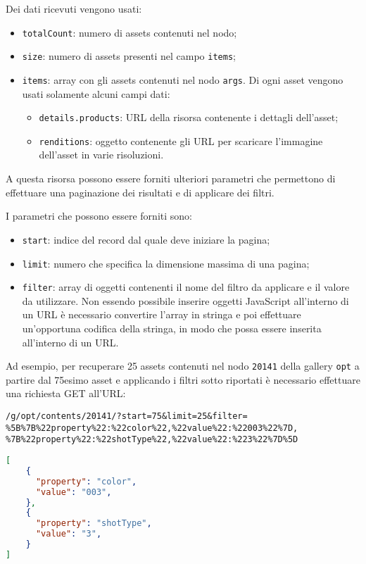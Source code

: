 Dei dati ricevuti vengono usati:
\begin{itemize}
\item \texttt{totalCount}: numero di assets contenuti nel nodo;
\item \texttt{size}: numero di assets presenti nel campo \texttt{items};
\item \texttt{items}: array con gli assets contenuti nel nodo \texttt{args}. Di ogni asset vengono usati solamente alcuni campi dati:
	\begin{itemize}
	\item \texttt{details.products}: URL della risorsa contenente i dettagli dell'asset;
	\item \texttt{renditions}: oggetto contenente gli URL per scaricare l'immagine dell'asset in varie risoluzioni.
	\end{itemize}
\end{itemize}

A questa risorsa possono essere forniti ulteriori parametri che permettono di effettuare una paginazione dei risultati e di applicare dei filtri.

I parametri che possono essere forniti sono:
\begin{itemize}
\item \texttt{start}: indice del record dal quale deve iniziare la pagina;
\item \texttt{limit}: numero che specifica la dimensione massima di una pagina;
\item \texttt{filter}: array di oggetti contenenti il nome del filtro da applicare e il valore da utilizzare. Non essendo possibile inserire oggetti JavaScript all'interno di un URL è necessario convertire l'array in stringa e poi effettuare un'opportuna codifica della stringa, in modo che possa essere inserita all'interno di un URL.
\end{itemize}

Ad esempio, per recuperare 25 assets contenuti nel nodo \texttt{20141} della gallery \texttt{opt} a partire dal 75esimo asset e applicando i filtri sotto riportati è necessario effettuare una richiesta GET all'URL:

\begin{center}
\texttt{/g/opt/contents/20141/?start=75\&limit=25\&filter= \%5B\%7B\%22property\%22:\%22color\%22,\%22value\%22:\%22003\%22\%7D, \%7B\%22property\%22:\%22shotType\%22,\%22value\%22:\%223\%22\%7D\%5D}
\end{center}

\begin{lstlisting}[language=JSON, caption=Esempio dell'array da utilizzare per applicare dei filtri alla risorsa /g/{galleryCode}/contents/{args}, label=lst:filters]
[
	{
	  "property": "color",
	  "value": "003",
	},
	{
	  "property": "shotType",
	  "value": "3",
	}
]
\end{lstlisting}
\FloatBarrier

